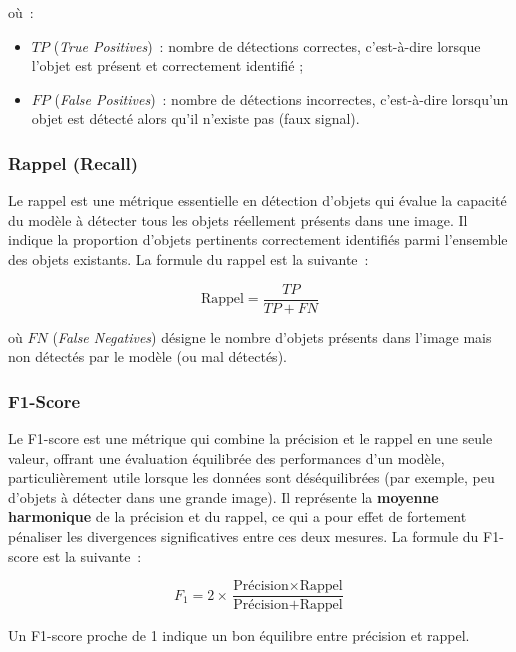 où~:
\begin{itemize}
  \item $TP$ (\textit{True Positives})~: nombre de détections correctes, c'est-à-dire
        lorsque l'objet est présent et correctement identifié ;
  \item $FP$ (\textit{False Positives})~: nombre de détections incorrectes, c'est-à-dire
        lorsqu'un objet est détecté alors qu'il n'existe pas (faux signal).
\end{itemize}

\subsubsection*{Rappel (Recall)}

Le rappel est une métrique essentielle en détection d'objets qui évalue la capacité
du modèle à détecter tous les objets réellement présents dans une image. Il indique
la proportion d'objets pertinents correctement identifiés parmi l'ensemble des
objets existants.
La formule du rappel est la suivante~:

\begin{equation}
\text{Rappel} = \frac{TP}{TP + FN}
\label{eq:rappel}
\end{equation}

où $FN$ (\textit{False Negatives}) désigne le nombre d'objets présents dans l'image
mais non détectés par le modèle (ou mal détectés).

\subsubsection*{F1-Score}

Le F1-score est une métrique qui combine la précision et le rappel en une seule valeur,
offrant une évaluation équilibrée des performances d'un modèle, particulièrement utile
lorsque les données sont déséquilibrées (par exemple, peu d'objets à détecter dans une
grande image). Il représente la \textbf{moyenne harmonique} de la précision et du rappel,
ce qui a pour effet de fortement pénaliser les divergences significatives entre ces deux mesures.
La formule du F1-score est la suivante~:

\begin{equation}
F_1 = 2 \times \frac{\text{Précision} \times \text{Rappel}}{\text{Précision} + \text{Rappel}}
\label{eq:f1}
\end{equation}

Un F1-score proche de 1 indique un bon équilibre entre précision et rappel.

